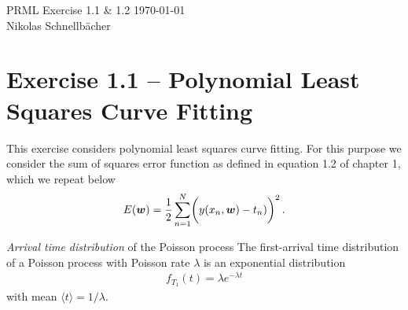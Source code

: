 \documentclass[11pt,DINA4, fleqn]{amsart}
\begin{document}

\tikzset{node distance=2cm, auto}





\begin{flushleft}
{\sc \Large PRML Exercise 1.1 \& 1.2} \hfill \today \\
\medskip
Nikolas Schnellbächer \underline{\hspace{6.53in}} \\
\end{flushleft}

\section*{Exercise 1.1 -- Polynomial Least Squares Curve Fitting}
This exercise considers polynomial least squares curve fitting. 
For this purpose we consider the sum of squares error function as defined in equation 1.2 of chapter 1, which we repeat below
\begin{align}
E(\boldsymbol{w}) = \dfrac{1}{2} \sum \displaylimits_{n = 1}^{N}
\biggl(y(x_n, \boldsymbol{w}) - t_n)\biggl)^2 \, .
\end{align}

\begin{mybox_tc3}{\emph{Arrival time distribution} of the Poisson process}
The first-arrival time distribution of a Poisson process with Poisson rate $\lambda$ is an exponential distribution
\begin{align}
f_{T_1}(t) = \lambda e^{-\lambda t}
\end{align}
with mean $\langle t\rangle = 1/\lambda$.
\end{mybox_tc3}
\end{document}
